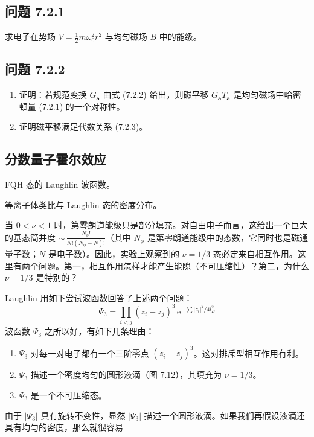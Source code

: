 
\subsection*{问题 7.2.1}

求电子在势场 $V=\frac{1}{2}m\omega_0^2r^2$ 与均匀磁场 $B$ 中的能级。

\subsection*{问题 7.2.2}

\begin{enumerate}
\item[(a)] 证明：若规范变换 $G_{\pmb{a}}$ 由式 (7.2.2) 给出，则磁平移 $G_{\pmb{a}}T_{\pmb{a}}$ 是均匀磁场中哈密顿量 (7.2.1) 的一个对称性。
\item[(b)] 证明磁平移满足代数关系 (7.2.3)。
\end{enumerate}

\subsection{分数量子霍尔效应}

\begin{keypoints}
\item FQH 态的 Laughlin 波函数。
\item 等离子体类比与 Laughlin 态的密度分布。
\end{keypoints}

当 $0<\nu<1$ 时，第零朗道能级只是部分填充。对自由电子而言，这给出一个巨大的基态简并度 ${\sim}\,\frac{N_\phi!}{N!(N_\phi-N)!}$（其中 $N_\phi$ 是第零朗道能级中的态数，它同时也是磁通量子数；$N$ 是电子数）。因此，实验上观察到的 $\nu=1/3$ 态必定来自相互作用。这里有两个问题。第一，相互作用怎样才能产生能隙（不可压缩性）？第二，为什么 $\nu=1/3$ 是特别的？

Laughlin 用如下尝试波函数回答了上述两个问题：
\begin{equation*}
\Psi_3 = \prod_{i<j}(z_i-z_j)^3\,\mathrm{e}^{-\sum|z_i|^2/4l_B^2}
\end{equation*}
波函数 $\Psi_3$ 之所以好，有如下几条理由：
\begin{enumerate}
\item[a)] $\Psi_3$ 对每一对电子都有一个三阶零点 $(z_i-z_j)^3$。这对排斥型相互作用有利。
\item[b)] $\Psi_3$ 描述一个密度均匀的圆形液滴（图 7.12），其填充为 $\nu=1/3$。
\item[c)] $\Psi_3$ 是一个不可压缩态。
\end{enumerate}

由于 $|\Psi_3|$ 具有旋转不变性，显然 $|\Psi_3|$ 描述一个圆形液滴。如果我们再假设液滴还具有均匀的密度，那么就很容易
